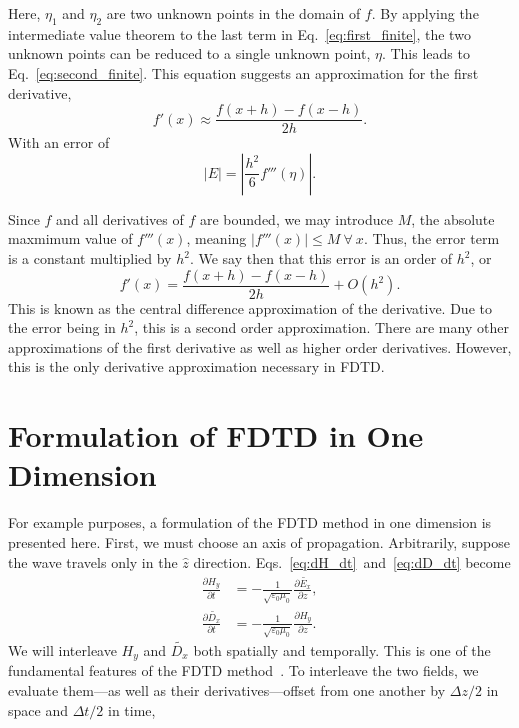 \documentclass[12pt]{article}
\begin{document}
\begin{multicols}{2}
Here, $\eta_1$ and $\eta_2$ are two unknown points in the domain of $f$. By applying the intermediate value theorem to the last term in Eq.~\ref{eq:first_finite}, the two unknown points can be reduced to a single unknown point, $\eta$. This leads to Eq.~\ref{eq:second_finite}. This equation suggests an approximation for the first derivative,
\begin{equation}
\label{eq:approx_central_difference}
f'(x) \approx \frac{f(x+h)-f(x-h)}{2h}.
\end{equation}
With an error of
\begin{equation}
|E| = \left|\frac{h^2}{6}f'''(\eta)\right|.
\end{equation}

Since $f$ and all derivatives of $f$ are bounded, we may introduce $M$, the absolute maxmimum value of $f'''(x)$, meaning $|f'''(x)|\leq M~\forall~x$. Thus, the error term is a constant multiplied by $h^2$. We say then that this error is an order of $h^2$, or
\begin{equation}
\label{eq:central_difference}
f'(x) = \frac{f(x+h)-f(x-h)}{2h} + O(h^2).
\end{equation}
This is known as the central difference approximation of the derivative. Due to the error being in $h^2$, this is a second order approximation. There are many other approximations of the first derivative as well as higher order derivatives. However, this is the only derivative approximation necessary in FDTD.
\section{Formulation of FDTD in One Dimension}
For example purposes, a formulation of the FDTD method in one dimension is presented here. First, we must choose an axis of propagation. Arbitrarily, suppose the wave travels only in the $\hat{z}$ direction. Eqs.~\ref{eq:dH_dt}~and~\ref{eq:dD_dt} become
\begin{subequations}
\begin{align}
\frac{\partial H_y}{\partial t} &= -\frac{1}{\sqrt{\varepsilon_0\mu_0}}\frac{\partial \tilde{E_x}}{\partial z}, \\
\frac{\partial \tilde{D_x}}{\partial t} &= -\frac{1}{\sqrt{\varepsilon_0\mu_0}}\frac{\partial H_y}{\partial z}.
\end{align}
\end{subequations}
We will interleave $H_y$ and $\tilde{D_x}$ both spatially and temporally. This is one of the fundamental features of the FDTD method~\cite{Sullivan00}. To interleave the two fields, we evaluate them---as well as their derivatives---offset from one another by $\Delta z/2$ in space and $\Delta t/2$ in time,
\end{multicols}
\end{document}
